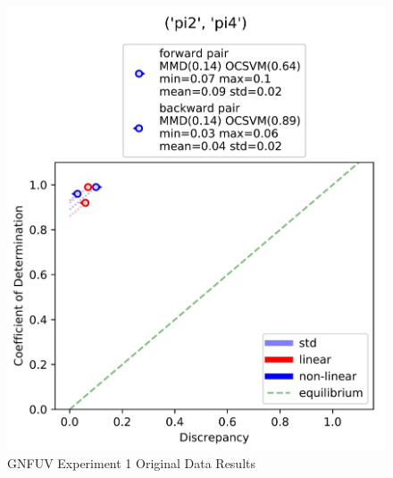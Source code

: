 \documentclass{mpaper}
\begin{document}
\begin{figure}
    \begin{center}
        \includegraphics[scale = 0.08]{experiment_1.jpg}
    \end{center}
    \caption{GNFUV Experiment 1 Original Data Results}
    \label{fig:gnfuv_exp1}
\end{figure}
\end{document}
